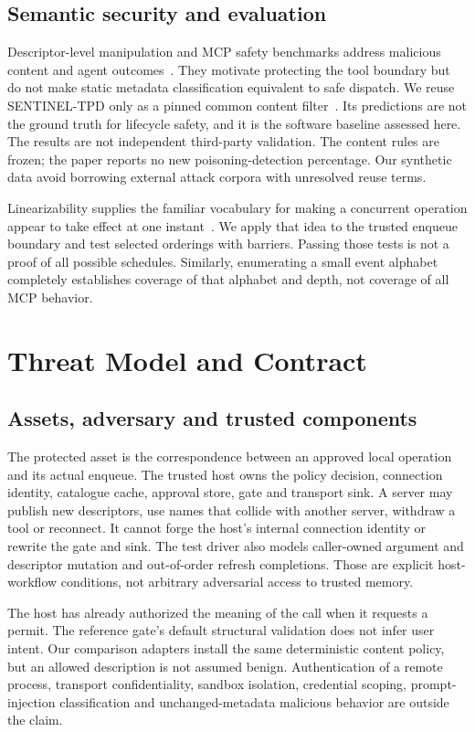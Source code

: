 \subsection{Semantic security and evaluation}
Descriptor-level manipulation and MCP safety benchmarks address malicious content
and agent outcomes~\cite{semanticattacks,msb}. They motivate protecting the tool
boundary but do not make static metadata classification equivalent to safe dispatch.
We reuse SENTINEL-TPD only as a pinned common content filter~\cite{sentineltpd}.
Its predictions are not the ground truth for lifecycle safety, and it is the software baseline assessed here. The results are not independent third-party validation. The content rules are frozen; the paper reports no
new poisoning-detection percentage. Our synthetic data avoid borrowing external
attack corpora with unresolved reuse terms.

Linearizability supplies the familiar vocabulary for making a concurrent operation
appear to take effect at one instant~\cite{linearizability}. We apply that idea to
the trusted enqueue boundary and test selected orderings with barriers. Passing
those tests is not a proof of all possible schedules. Similarly, enumerating a
small event alphabet completely establishes coverage of that alphabet and depth,
not coverage of all MCP behavior.

\section{Threat Model and Contract}
\subsection{Assets, adversary and trusted components}
The protected asset is the correspondence between an approved local operation and
its actual enqueue. The trusted host owns the policy decision, connection identity,
catalogue cache, approval store, gate and transport sink. A server may publish new
descriptors, use names that collide with another server, withdraw a tool or reconnect.
It cannot forge the host's internal connection identity or rewrite the gate and sink.
The test driver also models caller-owned argument and descriptor mutation and
out-of-order refresh completions. Those are explicit host-workflow conditions,
not arbitrary adversarial access to trusted memory.

The host has already authorized the meaning of the call when it requests a permit.
The reference gate's default structural validation does not infer user intent.
Our comparison adapters install the same deterministic content policy, but an
allowed description is not assumed benign. Authentication of a remote process,
transport confidentiality, sandbox isolation, credential scoping, prompt-injection
classification and unchanged-metadata malicious behavior are outside the claim.

